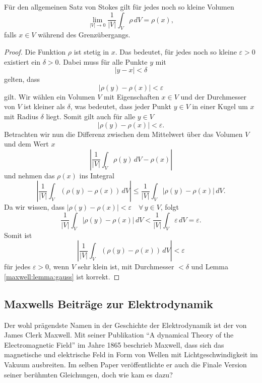\begin{lemma}
	\label{maxwell:lemma:gauss}
	Für den allgemeinen Satz von Stokes gilt für jedes noch so kleine Volumen
	\[
	\lim_{\left| V \right| \to 0} \frac{1}{\left| V \right|} \int_{V} \rho \, dV = \rho(x),
	\]
	falls $x\in V$ während des Grenzübergangs.
\end{lemma}
\begin{proof}
	Die Funktion $\rho$ ist stetig in $x$. Das bedeutet, für jedes noch so kleine $\varepsilon > 0$ existiert ein $\delta > 0$.
	Dabei muss für alle Punkte $y$ mit
	\[
	\left|y-x\right| < \delta	
	\]
	gelten, dass 
	\[
	\left|\rho(y) - \rho(x)\right| < \varepsilon
	\] 
	gilt.
	Wir wählen ein Volumen $V$ mit Eigenschaften $x \in V$ und der Durchmesser von $V$ ist kleiner als $\delta$, was bedeutet, dass jeder Punkt $y \in V$ in einer Kugel um $x$ mit Radius $\delta$ liegt.
	Somit gilt auch für alle $y \in V$
	\[
	\left|\rho(y) - \rho(x)\right| < \varepsilon .
	\]
	Betrachten wir nun die Differenz zwischen dem Mittelwert über das Volumen $V$ und dem Wert $x$
	\[
	\left|
	\frac{1}{\left|V\right|}
	\int_{V}
	\rho(y)
	\,
	dV
	-
	\rho(x)
	\right|
	\]
	und nehmen das $\rho(x)$ ins Integral
	\[
	\left|
	\frac{1}{\left|V\right|}
	\int_{V}
	(\rho(y) - \rho(x)) \, dV
	\right|
	\leq
	\frac{1}{\left|V\right|}
	\int_{V}
	\left|
	\rho(y) - \rho(x)
	\right|
	\,
	dV .
	\]
	Da wir wissen, dass $\left|\rho(y) - \rho(x)\right| < \varepsilon \quad \forall \, y \in V$, folgt
	\[
	\frac{1}{\left|V\right|}
	\int_{V}
	\left|
	\rho(y) - \rho(x)
	\right|
	\,
	dV
	<
	\frac{1}{\left|V\right|}
	\int_{V}
	\varepsilon
	\,
	dV
	=
	\varepsilon .
	\]
	Somit ist 
	\[
	\left|
	\frac{1}{\left|V\right|}
	\int_{V}
	(\rho(y) - \rho(x)) \, dV
	\right|
	<
	\varepsilon
	\]
	für jedes $\varepsilon > 0$, wenn $V$ sehr klein ist, mit Durchmesser $< \delta$ und Lemma \ref{maxwell:lemma:gauss} ist korrekt.
\end{proof}


\subsection{Maxwells Beiträge zur Elektrodynamik}
Der wohl prägendste Namen in der Geschichte der Elektrodynamik ist der von James Clerk Maxwell.
Mit seiner Publikation ``A dynamical Theory of the Electromagnetic Field'' \cite{maxwell:maxwell:theory} im Jahre 1865 beschrieb Maxwell, dass sich das magnetische und elektrische Feld in Form von Wellen mit Lichtgeschwindigkeit im Vakuum ausbreiten.
Im selben Paper veröffentlichte er auch die Finale Version seiner berühmten Gleichungen, doch wie kam es dazu?

